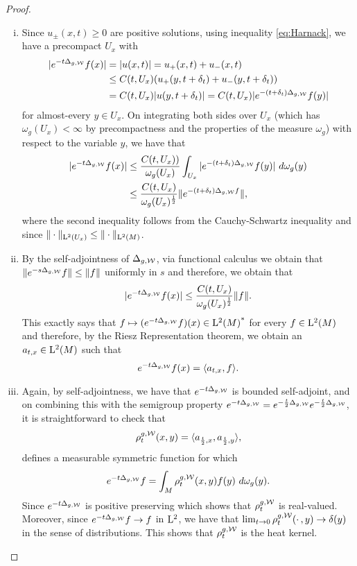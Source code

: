 \documentclass[a4paper, 12pt]{amsart}
\begin{document}
\begin{proof}
\begin{enumerate}[(i)]
\item  Since $u_{\pm}(x,t) \geq 0$ are positive solutions,
	using inequality \eqref{eq:Harnack}, we have a precompact $U_x$ 
	with 
	\begin{align*} 
	|e^{-t \Delta_{g,\mathcal{W}}}f(x)|  &= |u(x,t)| = u_+(x,t) + u_-(x,t) \\
		&\leq C(t,U_x) (u_+(y,t+\delta_t) + u_-(y,t+\delta_t)) \\
		&= C(t,U_x) |u(y,t + \delta_t)|
		= C(t,U_x)  |e^{-(t + \delta_t) \Delta_{g,\mathcal{W}}}f(y)|
	\end{align*} 
	for almost-every $y \in U_x$.
	On integrating both sides over $U_x$ (which has $\omega_g(U_x) < \infty$
	by precompactness and the properties of the measure $\omega_g$) with respect
	to the variable $y$,
	we have that
	\begin{align*} 
	|e^{-t \Delta_{g,\mathcal{W}}}f(x)| 
		&\leq \frac{C(t,U_x))}{\omega_g(U_x)} \int_{U_x} |e^{-(t + \delta_t) \Delta_{g,\mathcal{W}}}f(y)|\ d\omega_g(y) \\
		&\leq \frac{C(t,U_x)}{\omega_g(U_x)^{\frac{1}{2}}} \| e^{-(t + \delta_t) \Delta_{g,\mathcal{W}}f} \|,
	\end{align*}
	where the second inequality follows from the Cauchy-Schwartz
	inequality and since $\| \cdot \|_{{\rm L}^{2}_{\rm {}}(U_x)} \leq \| \cdot \|_{{\rm L}^{2}_{\rm {}}(M)}$.

\item By the self-adjointness of $\Delta_{g,\mathcal{W}}$, via functional calculus 
	we obtain that $\| e^{-s\Delta_{g,\mathcal{W}}}f \| \leq \| f \|$
	uniformly in $s$  and therefore, we obtain that
	$$|e^{-t \Delta_{g,\mathcal{W}}}f(x)| \leq 
		\frac{C(t,U_x)}{\omega_g(U_x)^{\frac{1}{2}}} \| f \|.$$
	This exactly says that $f \mapsto (e^{-t\Delta_{g,\mathcal{W}}}f)(x) \in {{\rm L}^{2}_{\rm {}}(M)}^\ast$
	for every $f \in {\rm L}^{2}_{\rm {}}(M)$ and therefore, by the Riesz Representation theorem,
	we obtain an $a_{t,x} \in {\rm L}^{2}_{\rm {}}(M)$ such that
	$$ e^{-t \Delta_{g,\mathcal{W}}}f(x) = \langle a_{t,x},f \rangle.$$

\item Again, by self-adjointness, we have that $e^{-t \Delta_{g,\mathcal{W}}}$
	is bounded self-adjoint, and
	on combining this with the semigroup property 
	$e^{-t\Delta_{g,\mathcal{W}}} = e^{-\frac{t}{2} \Delta_{g,\mathcal{W}}}e^{-\frac{t}{2} \Delta_{g,\mathcal{W}}}$, 
	it is straightforward to check that 
		$$\rho^{g,\mathcal{W}}_t(x,y) = \langle a_{\frac{t}{2}, x}, a_{\frac{t}{2}, y} \rangle,$$
	defines a measurable symmetric function for which 
	$$e^{-t \Delta_{g,\mathcal{W}}}f = \int_{M} \rho^{g,\mathcal{W}}_t(x,y)f(y)\ d\omega_g(y).$$
	Since $e^{-t \Delta_{g,\mathcal{W}}}$
	is positive preserving which shows that $\rho_t^{g,\mathcal{W}}$
	is real-valued. Moreover, since $e^{-t\Delta_{g,\mathcal{W}}}f \to f$
	in ${\rm L}^{2}_{\rm {}}$, we have that 
	$\lim_{t \to 0} \rho^{g,\mathcal{W}}_t(\cdotp,y) \to  \delta(y)$
	in the sense of distributions. This
	shows that $\rho^{g,\mathcal{W}}_t$ is the heat kernel.


\end{enumerate}
\end{proof}
\end{document}
